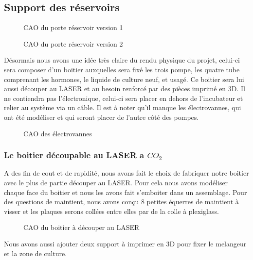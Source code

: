 \documentclass[a4paper, 11pt]{article}
\begin{document}
\subsection{Support des réservoirs}
\begin{multicols}{2}
    \begin{figure}[H]
        \centering
        \caption{CAO du porte réservoir version 1}
        \label{fig:CAO_reservoir1}
    \end{figure}
    \begin{figure}[H]
        \centering
        \caption{CAO du porte réservoir version 2}
        \label{fig:CAO_reservoir2}
    \end{figure}
\end{multicols}
Désormais nous avons une idée très claire du rendu physique du projet, celui-ci sera composer d'un boitier auxquelles sera fixé les trois pompe, les quatre tube comprenant les hormones, le liquide de culture neuf, et usagé.
Ce boitier sera lui aussi découper au LASER et au besoin renforcé par des pièces imprimé en 3D.
Il ne contiendra pas l'électronique, celui-ci sera placer en dehors de l'incubateur et relier au système via un câble.
Il est à noter qu'il manque les électrovannes, qui ont été modéliser et qui seront placer de l'autre côté des pompes.
\begin{figure}[H]
    \centering
    \caption{CAO des électrovannes}
    \label{fig:CAO_electrovanne}
\end{figure}
\subsubsection{Le boitier découpable au LASER a $ CO_2 $}
A des fin de cout et de rapidité, nous avons fait le choix de fabriquer notre boitier avec le
plus de partie découper au LASER. Pour cela nous avons modéliser chaque face du boitier et nous
les avons fait s'emboiter dans un assemblage.
Pour des questions de maintient, nous avons conçu 8 petites équerres de maintient à visser
et les plaques serons collées entre elles par de la colle à plexiglass.
\begin{figure}[H]
    \centering
    \caption{CAO du boitier à découper au LASER}
    \label{fig:CAO_boitier_decoupe_LASER}
\end{figure}
Nous avons aussi ajouter deux support à imprimer en 3D pour fixer le melangeur et la zone de culture.
\newpage
\end{document}
